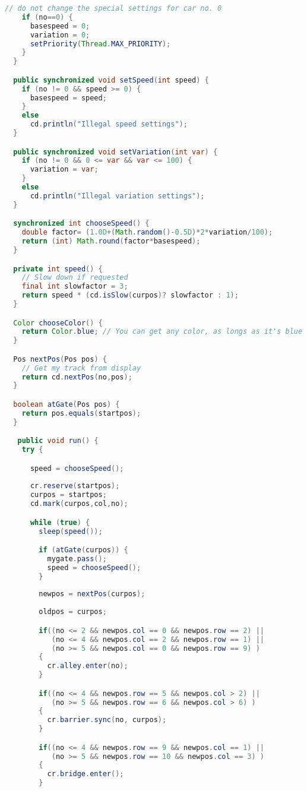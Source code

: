 \begin{lstlisting}[language=java]
    // do not change the special settings for car no. 0
    if (no==0) {
      basespeed = 0;  
      variation = 0; 
      setPriority(Thread.MAX_PRIORITY); 
    }
  }

  public synchronized void setSpeed(int speed) { 
    if (no != 0 && speed >= 0) {
      basespeed = speed;
    }
    else
      cd.println("Illegal speed settings");
  }

  public synchronized void setVariation(int var) { 
    if (no != 0 && 0 <= var && var <= 100) {
      variation = var;
    }
    else
      cd.println("Illegal variation settings");
  }

  synchronized int chooseSpeed() { 
    double factor= (1.0D+(Math.random()-0.5D)*2*variation/100);
    return (int) Math.round(factor*basespeed);
  }

  private int speed() {
    // Slow down if requested
    final int slowfactor = 3;  
    return speed * (cd.isSlow(curpos)? slowfactor : 1);
  }

  Color chooseColor() { 
    return Color.blue; // You can get any color, as longs as it's blue 
  }

  Pos nextPos(Pos pos) {
    // Get my track from display
    return cd.nextPos(no,pos);
  }

  boolean atGate(Pos pos) {
    return pos.equals(startpos);
  }

   public void run() {
    try {

      speed = chooseSpeed();
      
      cr.reserve(startpos);
      curpos = startpos;
      cd.mark(curpos,col,no);

      while (true) { 
        sleep(speed());

        if (atGate(curpos)) { 
          mygate.pass(); 
          speed = chooseSpeed();
        }
        	
        newpos = nextPos(curpos);
        
        oldpos = curpos;

        if((no <= 2 && newpos.col == 0 && newpos.row == 2) ||
           (no <= 4 && newpos.col == 2 && newpos.row == 1) ||
           (no >= 5 && newpos.col == 0 && newpos.row == 9) )
        {
          cr.alley.enter(no);
        }

        if((no <= 4 && newpos.row == 5 && newpos.col > 2) ||
           (no >= 5 && newpos.row == 6 && newpos.col > 6) )
        {
          cr.barrier.sync(no, curpos);
        }

        if((no <= 4 && newpos.row == 9 && newpos.col == 1) ||
           (no >= 5 && newpos.row == 10 && newpos.col == 3) )
        {
          cr.bridge.enter();
        }


\end{lstlisting}
